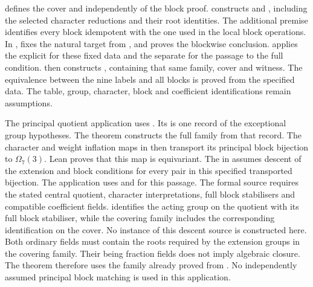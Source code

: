 \begin{implementation}
 defines the cover and
 independently of the block proof.
 constructs
 and , including the selected
character reductions and their root identities. The additional
 premise identifies every block idempotent
with the one used in the local block operations.
In ,
 fixes the natural target from , and
 proves the blockwise conclusion.
 applies the explicit
 for these fixed data and the separate
 for the passage to the full condition.
 then constructs
, containing that same family, cover and witness.
The equivalence between the nine labels and all blocks is proved from the
specified data. The table, group, character, block and coefficient
identifications remain assumptions.

The principal quotient application uses
.
Its  is one record of the exceptional
group hypotheses. The theorem  constructs
the full family from that record. The character and weight inflation
maps in  then transport its principal block
bijection to $\Omega_7(3)$. Lean proves that this map is equivariant.
The  in 
assumes descent of the extension and block conditions for every pair in
this specified transported bijection. The application uses
\cite[Proposition~4.6]{Spath2013} and \cite[Theorem~4.4]{Spath2017Triples}
for this passage. The formal source requires the stated central quotient,
character interpretations, full block stabilisers and compatible coefficient
fields.  identifies the acting group
on the quotient with its full block stabiliser, while the covering family
includes the corresponding identification on the cover.
No instance of this descent source is constructed here.
Both ordinary fields must contain the roots
required by the extension groups in the covering family. Their being
fraction fields does not imply algebraic closure.
The theorem  therefore uses the family
already proved from . No independently assumed principal
block matching is used in this application.
\end{implementation}

